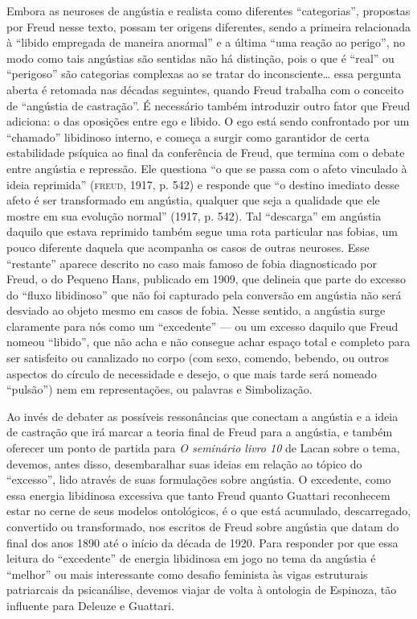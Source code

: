 Embora as neuroses de angústia e realista como diferentes
``categorias'', propostas por Freud nesse texto, possam ter origens
diferentes, sendo a primeira relacionada à ``libido empregada de maneira
anormal'' e a última ``uma reação ao perigo'', no modo como tais
angústias são sentidas não há distinção, pois o que é ``real'' ou
``perigoso'' são categorias complexas ao se tratar do
inconsciente\ldots{} essa pergunta aberta é retomada nas décadas
seguintes, quando Freud trabalha com o conceito de ``angústia de
castração''. É necessário também introduzir outro fator que Freud
adiciona: o das oposições entre ego e libido. O ego está sendo
confrontado por um ``chamado'' libidinoso interno, e começa a surgir
como garantidor de certa estabilidade psíquica ao final da conferência
de Freud, que termina com o debate entre angústia e repressão. Ele
questiona ``o que se passa com o afeto vinculado à ideia reprimida''
(\textsc{freud}, 1917, p. 542) e responde que ``o destino imediato desse afeto é
ser transformado em angústia, qualquer que seja a qualidade que ele
mostre em sua evolução normal'' (1917, p. 542). Tal ``descarga''
em angústia daquilo que estava reprimido também segue uma rota
particular nas fobias, um pouco diferente daquela que acompanha os casos
de outras neuroses. Esse ``restante'' aparece descrito no caso mais
famoso de fobia diagnosticado por Freud, o do Pequeno Hans, publicado em
1909, que delineia que parte do excesso do ``fluxo libidinoso'' que não
foi capturado pela conversão em angústia não será desviado ao objeto
mesmo em casos de fobia. Nesse sentido, a angústia surge claramente para
nós como um ``excedente'' --- ou um excesso daquilo que Freud nomeou
``libido'', que não acha e não consegue achar espaço total e completo
para ser satisfeito ou canalizado no corpo (com sexo, comendo, bebendo,
ou outros aspectos do círculo de necessidade e desejo, o que mais tarde
será nomeado ``pulsão'') nem em representações, ou palavras e
Simbolização.

Ao invés de debater as possíveis ressonâncias que conectam a angústia e
a ideia de castração que irá marcar a teoria final de Freud para a
angústia, e também oferecer um ponto de partida para \emph{O seminário livro 10} de
Lacan sobre o tema, devemos, antes disso, desembaralhar suas ideias em
relação ao tópico do ``excesso'', lido através de suas formulações sobre
angústia. O excedente, como essa energia libidinosa excessiva que tanto
Freud quanto Guattari reconhecem estar no cerne de seus modelos
ontológicos, é o que está acumulado, descarregado, convertido ou
transformado, nos escritos de Freud sobre angústia que datam do final
dos anos 1890 até o início da década de 1920. Para responder por que
essa leitura do ``excedente'' de energia libidinosa em jogo no tema da
angústia é ``melhor'' ou mais interessante como desafio feminista às
vigas estruturais patriarcais da psicanálise, devemos viajar de volta à
ontologia de Espinoza, tão influente para Deleuze e Guattari.

